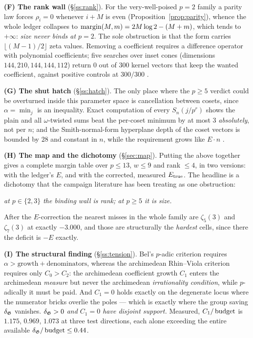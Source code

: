\smallskip\noindent\textbf{(F) The rank wall} (\S\ref{ss:rank}). For the very-well-poised
$p=2$ family a parity law forces $\rho_i=0$ whenever $i+M$ is even
(Proposition~\ref{prop:parity}), whence the whole ledger collapses to
$\operatorname{margin}(M,m)=2M\log2-(M+m)$, which tends to $+\infty$: \emph{size never binds at $p=2$}. The
sole obstruction is that the form carries $\lfloor(M-1)/2\rfloor$ zeta values. Removing a
coefficient requires a difference operator with polynomial coefficients; five searches over
inset cones (dimensions $144,210,144,144,112$) return $0$ out of $300$ kernel vectors that
keep the wanted coefficient, against positive controls at $300/300$
.

\smallskip\noindent\textbf{(G) The shut hatch} (\S\ref{ss:hatch}). The only place where the
$p\ge5$ verdict could be overturned inside this parameter space is cancellation between
cosets, since $\alpha=\min_j$ is an inequality. Exact computation of every $S_n(j/p^r)$
shows the plain and all $\omega$-twisted sums beat the per-coset minimum by at most $3$
\emph{absolutely}, not per $n$; and the Smith-normal-form hyperplane depth of the coset
vectors is bounded by $28$ and constant in $n$, while the requirement grows like $E\cdot n$
.

\smallskip\noindent\textbf{(H) The map and the dichotomy} (\S\ref{sec:map}). Putting the
above together gives a complete margin table over $p\le13$, $w\le9$ and rank $\le4$, in two
versions: with the ledger's $E$, and with the corrected, measured $E_{\mathrm{true}}$. The headline is
a dichotomy that the campaign literature has been treating as one obstruction:
\begin{center}
\emph{at $p\in\{2,3\}$ the binding wall is rank; at $p\ge5$ it is size.}
\end{center}
After the $E$-correction the nearest misses in the whole family are $\zeta_5(3)$ and
$\zeta_7(3)$ at exactly $-3.000$, and those are structurally the \emph{hardest} cells, since
there the deficit is $-E$ exactly.

\smallskip\noindent\textbf{(I) The structural finding} (\S\ref{ss:tension}). Bel's $p$-adic
criterion requires $\alpha>\text{growth}+\text{denominators}$, whereas the archimedean
Rhin--Viola criterion requires only $C_0>C_2$: the archimedean coefficient growth $C_1$
enters the archimedean \emph{measure} but never the archimedean \emph{irrationality
condition}, while $p$-adically it must be paid. And $C_1=0$ holds exactly on the degenerate
locus where the numerator bricks overlie the poles --- which is exactly where the group
saving $\delta_{\mathfrak{G}}$ vanishes. \emph{$\delta_{\mathfrak{G}}>0$ and $C_1=0$ have disjoint support.} Measured,
$C_1/\operatorname{budget}$ is $1.175$, $0.969$, $1.073$ at three test directions, each alone exceeding the
entire available $\delta_{\mathfrak{G}}/\operatorname{budget}\le0.44$.

